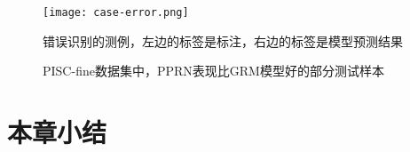 \begin{figure}[htpb]
	\centering
	\texttt{[image: case-error.png]}
    \caption{错误识别的测例，左边的标签是标注，右边的标签是模型预测结果}
	\vspace*{-3.5mm}
	\label{fig:exp-error-case}
\end{figure}

\begin{figure}[htpb]
	\centering
    \caption{PISC-fine数据集中，PPRN表现比GRM模型好的部分测试样本}
    \label{fig:exp-case-study}
\end{figure}

\section{本章小结}

